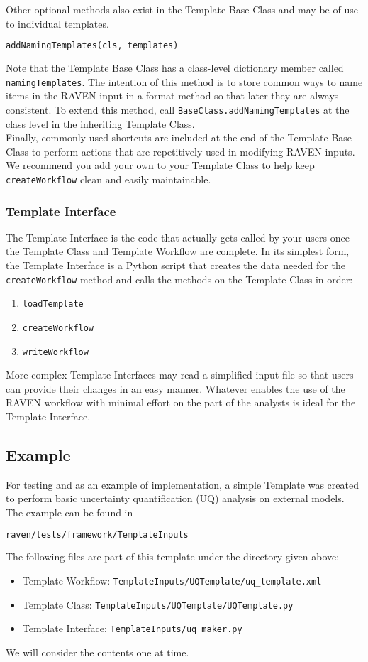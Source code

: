 Other optional methods also exist in the Template Base Class and may be of use to individual templates.
\begin{lstlisting}[language=python]
 addNamingTemplates(cls, templates)
\end{lstlisting}
Note that the Template Base Class has a class-level dictionary member called \texttt{namingTemplates}. The intention of this method is to store common ways to name items in the RAVEN input in a format method so that later they are always consistent. To extend this method, call \texttt{BaseClass.addNamingTemplates} at the class level in the inheriting Template Class.
\\

Finally, commonly-used shortcuts are included at the end of the Template Base Class to perform actions that are repetitively used in modifying RAVEN inputs. We recommend you add your own to your Template Class to help keep
\texttt{createWorkflow} clean and easily maintainable.

\subsubsection{Template Interface}
The Template Interface is the code that actually gets called by your users once the Template Class and Template Workflow are complete. In its simplest form, the Template Interface is a Python script that creates the data needed for the \texttt{createWorkflow} method and calls the methods on the Template Class in order:
\begin{enumerate}
  \item \texttt{loadTemplate}
  \item \texttt{createWorkflow}
  \item \texttt{writeWorkflow}
\end{enumerate}
More complex Template Interfaces may read a simplified input file so that users can provide their changes in an easy manner. Whatever enables the use of the RAVEN workflow with minimal effort on the part of the analysts is ideal for the Template Interface.

\subsection{Example}
For testing and as an example of implementation, a simple Template was created to perform basic uncertainty quantification (UQ) analysis on external models. The example can be found in
\begin{lstlisting}[language=bash]
 raven/tests/framework/TemplateInputs
\end{lstlisting}
The following files are part of this template under the directory given above:
\begin{itemize}
  \item Template Workflow: \texttt{TemplateInputs/UQTemplate/uq\_template.xml}
  \item Template Class: \texttt{TemplateInputs/UQTemplate/UQTemplate.py}
  \item Template Interface: \texttt{TemplateInputs/uq\_maker.py}
\end{itemize}
We will consider the contents one at time.
